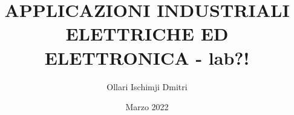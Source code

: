\documentclass{article}
\begin{document}
    \author{Ollari Ischimji Dmitri}
    \title{APPLICAZIONI INDUSTRIALI ELETTRICHE ED ELETTRONICA - lab?!}
    \date{Marzo 2022}

    \maketitle
    \tableofcontents

    \listoffigures
    \listoftables

    
    
    
\end{document}
